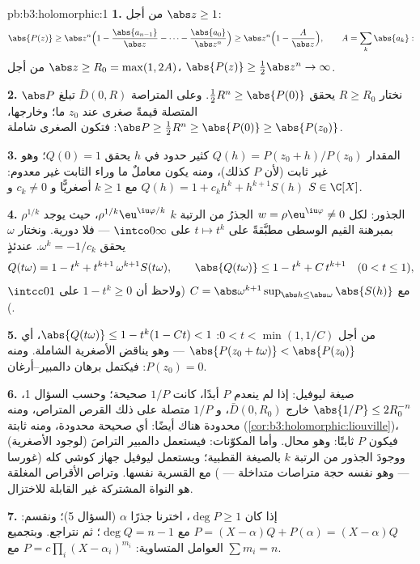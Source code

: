 \begin{solution}{pb:b3:holomorphic:1}
\textbf{1.} من أجل $\abs z \geq 1$:
\[
\abs{P(z)} \geq \abs z^n\Bigl(1 -
\frac{\abs{a_{n-1}}}{\abs z} - \dots -
\frac{\abs{a_0}}{\abs z^n}\Bigr)
\geq \abs z^n\Bigl(1 - \frac{A}{\abs z}\Bigr),
\qquad A = \sum_k\abs{a_k} :
\]
من أجل $\abs z \geq R_0 = \max(1, 2A)$، $\abs{P(z)} \geq
\frac12\abs z^n \to \infty$.

\textbf{2.} نختار $R \geq R_0$ يحقق $\frac12R^n \geq
\abs{P(0)}$. وعلى المتراصة
$\bar D(0, R)$ تبلغ $\abs P$ المتصلة قيمةً صغرى عند $z_0$ ما؛
وخارجها، $\abs P
\geq \frac12R^n \geq \abs{P(0)} \geq \abs{P(z_0)}$: فتكون الصغرى شاملة.

\textbf{3.} المقدار $Q(h) = P(z_0 + h)/P(z_0)$ كثير حدود في $h$ يحقق $Q(0) = 1$؛
وهو غير ثابت (لأن $P$ كذلك)، ومنه يكون معاملٌ ما وراء الثابت
غير معدوم: $Q(h) = 1 +
c_kh^k + h^{k+1}S(h)$ مع $k \geq 1$ أصغريًّا و $c_k \neq 0$
و $S \in \C[X]$.

\textbf{4.} الجذور: لكل $w = \rho\eu^{\iu\varphi} \neq 0$ الجذرُ من الرتبة $k$ $\rho^{1/k}\eu^{\iu\varphi/k}$،
حيث يوجد $\rho^{1/k}$ بمبرهنة القيم الوسطى مطبَّقةً على
$t \mapsto t^k$ على $\intco0\infty$ --- فلا دورية. ونختار
$\omega$ يحقق $\omega^k = -1/c_k$. عندئذٍ
\[
Q(t\omega) = 1 - t^k + t^{k+1}\,\omega^{k+1}S(t\omega),
\qquad
\abs{Q(t\omega)} \leq 1 - t^k + C\,t^{k+1}
\quad (0 < t \leq 1),
\]
مع $C = \abs\omega^{k+1}\sup_{\abs h \leq
\abs\omega}\abs{S(h)}$ (ولاحظ أن $1 - t^k \geq 0$ على $\intcc01$).

\textbf{5.} من أجل $0 < t < \min(1, 1/C)$: $\abs{Q(t\omega)}
\leq 1 - t^k(1 - Ct) < 1$، أي $\abs{P(z_0 + t\omega)} <
\abs{P(z_0)}$ --- وهو يناقض
الأصغرية الشاملة. ومنه $P(z_0) = 0$: فيكتمل برهان
دالمبير--أرغان.

\textbf{6.} صيغة ليوفيل: إذا لم ينعدم $P$ أبدًا، كانت $1/P$
صحيحة؛ وحسب السؤال 1، $\abs{1/P} \leq 2R_0^{-n}$ خارج $\bar D(0, R_0)$، و $1/P$
متصلة على ذلك القرص المتراص، ومنه محدودة هناك أيضًا: أي صحيحة
محدودة، ومنه ثابتة (\cref{cor:b3:holomorphic:liouville})، فيكون $P$ ثابتًا: وهو محال.
وأما المكوّنات: فيستعمل دالمبير التراصَ (لوجود الأصغرية) ووجودَ
الجذور من الرتبة $k$ بالصيغة القطبية؛ ويستعمل ليوفيل جهاز كوشي
كله (غورسا --- وهو نفسه حجة متراصات متداخلة --- )
مع القسرية نفسها. وتراص الأقراص المغلقة هو النواة المشتركة غير
القابلة للاختزال.

\textbf{7.} إذا كان $\deg P \geq 1$، اخترنا جذرًا $\alpha$
(السؤال 5)؛ ونقسم: $P = (X - \alpha)Q + P(\alpha) = (X -
\alpha)Q$ مع $\deg Q = n - 1$؛ ثم نتراجع.
وبتجميع العوامل المتساوية: $P = c\prod_i(X - \alpha_i)^{m_i}$ مع $\sum m_i = n$.


\end{solution}
